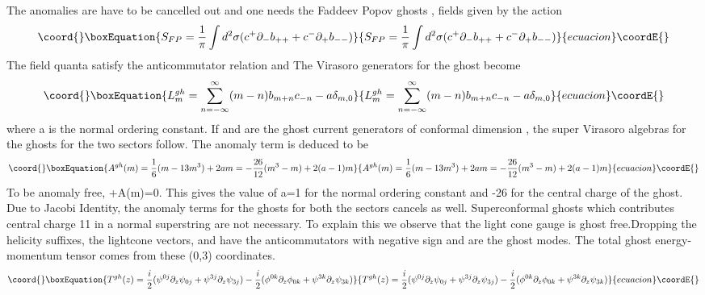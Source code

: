 \documentclass[a4paper,showpacs,preprintnumbers,amsmath,amssymb]{revtex4}
\begin{document}
The anomalies are have to be cancelled out and one needs the Faddeev Popov
ghosts \coordHE{}, \coordHE{} fields given by the action
\begin{equation}\coord{}\boxEquation{
S_{FP}= \frac{1}{\pi}\int d^2\sigma (c^+\partial_-b_{++}+c^-\partial_+b_{--})
}{
S_{FP}= \frac{1}{\pi}\int d^2\sigma (c^+\partial_-b_{++}+c^-\partial_+b_{--})
}{ecuacion}\coordE{}\end{equation}
The \coordHE{} field quanta \coordHE{} satisfy the anticommutator relation
\coordHE{} and \coordHE{}
The Virasoro generators for the ghost become
\begin{equation}\coord{}\boxEquation{
L_m^{gh}=\sum^{\infty}_{n=-\infty}(m-n)b_{m+n}c_{-n}-a\delta_{m,0}
}{
L_m^{gh}=\sum^{\infty}_{n=-\infty}(m-n)b_{m+n}c_{-n}-a\delta_{m,0}
}{ecuacion}\coordE{}\end{equation}
where a is the normal ordering constant. If \coordHE{} and \coordHE{} are 
the ghost current generators of conformal dimension \coordHE{}, the super 
Virasoro algebras for the ghosts for the two sectors follow. The anomaly 
term is deduced to be
\begin{equation}\coord{}\boxEquation{
A^{gh}(m)=\frac{1}{6}(m-13m^3) +2am=-\frac{26}{12}(m^3-m) +2(a-1)m
}{
A^{gh}(m)=\frac{1}{6}(m-13m^3) +2am=-\frac{26}{12}(m^3-m) +2(a-1)m
}{ecuacion}\coordE{}\end{equation}
To be anomaly free, \coordHE{} +A(m)=0. This gives the value of a=1 for the normal 
ordering constant and -26 for the central charge of the ghost. Due to Jacobi 
Identity, the anomaly terms for the ghosts for both the sectors cancels as well.
Superconformal ghosts which contributes central charge 11 in a normal superstring
are not necessary. To explain this we observe that the light cone gauge is
ghost free.Dropping the helicity suffixes, the lightcone vectors,
\coordHE{} and
\coordHE{} have the 
anticommutators with negative sign and are the ghost modes. The total ghost 
energy-momentum tensor comes from these (0,3) coordinates.
\begin{equation}\coord{}\boxEquation{
T^{gh}(z)= \frac{i}{2}( \psi^{0j}\partial_z\psi_{0j}  +
\psi^{3j}\partial_z\psi_{3j})
-\frac{i}{2}( \phi^{0k}\partial_z\phi_{0k}  +
\psi^{3k}\partial_z\psi_{3k} )
}{
T^{gh}(z)= \frac{i}{2}( \psi^{0j}\partial_z\psi_{0j}  +
\psi^{3j}\partial_z\psi_{3j})
-\frac{i}{2}( \phi^{0k}\partial_z\phi_{0k}  +
\psi^{3k}\partial_z\psi_{3k} )
}{ecuacion}\coordE{}\end{equation}
\end{document}
